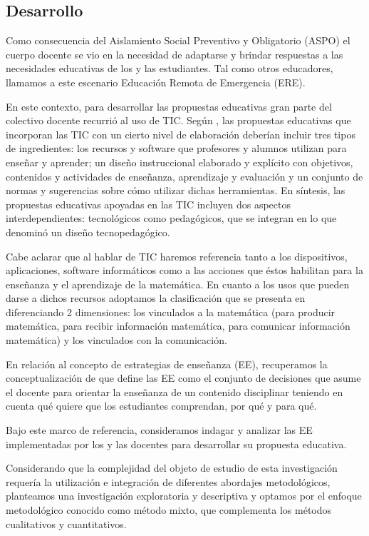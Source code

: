 \subsection{Desarrollo}

Como consecuencia del Aislamiento Social Preventivo y Obligatorio (ASPO) el cuerpo docente se vio en la necesidad de adaptarse y brindar respuestas a las necesidades educativas de los y las estudiantes. Tal como otros educadores, llamamos a este escenario Educación Remota de Emergencia (ERE).

En este contexto, para desarrollar las propuestas educativas gran parte del colectivo docente recurrió al uso de TIC. Según \textcite{coll2011}, las propuestas educativas que incorporan las TIC con un cierto nivel de elaboración deberían incluir tres tipos de ingredientes: los recursos y software que profesores y alumnos utilizan para enseñar y aprender; un diseño instruccional elaborado y explícito con objetivos, contenidos y actividades de enseñanza, aprendizaje y evaluación y un conjunto de normas y sugerencias sobre cómo utilizar dichas herramientas. En síntesis, las propuestas educativas apoyadas en las TIC incluyen dos aspectos interdependientes: tecnológicos como pedagógicos, que se integran en lo que \textcite{coll2011} denominó un diseño tecnopedagógico.

Cabe aclarar que al hablar de TIC haremos referencia tanto a los dispositivos, aplicaciones, software informáticos como a las acciones que éstos habilitan para la enseñanza y el aprendizaje de la matemática. En cuanto a los usos que pueden darse a dichos recursos adoptamos la clasificación que se presenta en \textcite{bravo2016} diferenciando 2 dimensiones: los vinculados a la matemática (para producir matemática, para recibir información matemática, para comunicar información matemática) y los vinculados con la comunicación.

En relación al concepto de estrategias de enseñanza (EE), recuperamos la conceptualización de \textcite{anijovich2010} que define las EE como el conjunto de decisiones que asume el docente para orientar la enseñanza de un contenido disciplinar teniendo en cuenta qué quiere que los estudiantes comprendan, por qué y para qué.

Bajo este marco de referencia, consideramos indagar y analizar las EE implementadas por los y las docentes para desarrollar su propuesta educativa.

Considerando que la complejidad del objeto de estudio de esta investigación requería la utilización e integración de diferentes abordajes metodológicos, planteamos una investigación exploratoria y descriptiva y optamos por el enfoque metodológico conocido como método mixto, que complementa los métodos cualitativos y cuantitativos.

